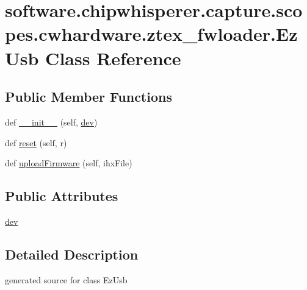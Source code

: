 \hypertarget{classsoftware_1_1chipwhisperer_1_1capture_1_1scopes_1_1cwhardware_1_1ztex__fwloader_1_1EzUsb}{}\section{software.\+chipwhisperer.\+capture.\+scopes.\+cwhardware.\+ztex\+\_\+fwloader.\+Ez\+Usb Class Reference}
\label{classsoftware_1_1chipwhisperer_1_1capture_1_1scopes_1_1cwhardware_1_1ztex__fwloader_1_1EzUsb}
\subsection*{Public Member Functions}
\begin{DoxyCompactItemize}
\item 
def \hyperlink{classsoftware_1_1chipwhisperer_1_1capture_1_1scopes_1_1cwhardware_1_1ztex__fwloader_1_1EzUsb_aa5bc39c8f7fab44720fed0eb8ae9c77c}{\+\_\+\+\_\+init\+\_\+\+\_\+} (self, \hyperlink{classsoftware_1_1chipwhisperer_1_1capture_1_1scopes_1_1cwhardware_1_1ztex__fwloader_1_1EzUsb_ad9513c7220e3dda53b4fb0f1466e8fd1}{dev})
\item 
def \hyperlink{classsoftware_1_1chipwhisperer_1_1capture_1_1scopes_1_1cwhardware_1_1ztex__fwloader_1_1EzUsb_af58a4f019c8a885ec227514658878dc7}{reset} (self, r)
\item 
def \hyperlink{classsoftware_1_1chipwhisperer_1_1capture_1_1scopes_1_1cwhardware_1_1ztex__fwloader_1_1EzUsb_a66c1c58110c6f2a78d07f091c31c6890}{upload\+Firmware} (self, ihx\+File)
\end{DoxyCompactItemize}
\subsection*{Public Attributes}
\begin{DoxyCompactItemize}
\item 
\hyperlink{classsoftware_1_1chipwhisperer_1_1capture_1_1scopes_1_1cwhardware_1_1ztex__fwloader_1_1EzUsb_ad9513c7220e3dda53b4fb0f1466e8fd1}{dev}
\end{DoxyCompactItemize}


\subsection{Detailed Description}
\begin{DoxyVerb}generated source for class EzUsb \end{DoxyVerb}
 

